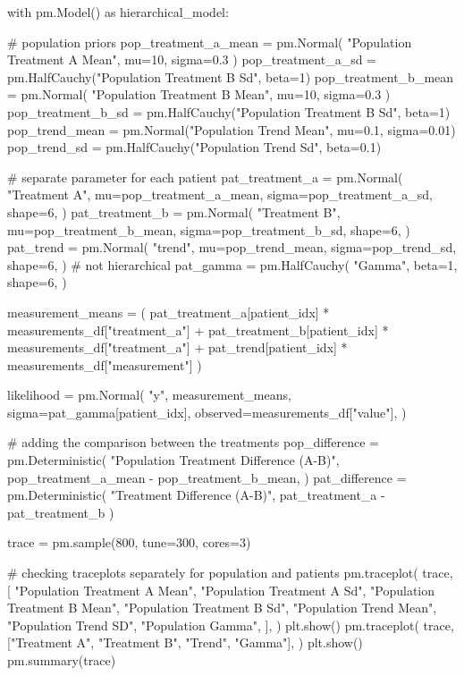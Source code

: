 \documentclass[12pt,a4paper,leqno]{report}
\theoremstyle{plain}
\theoremstyle{definition}
\theoremstyle{remark}
\begin{document}
\bigskip
\begin{pyverbatim}[][fontsize=\footnotesize]

with pm.Model() as hierarchical_model:

    # population priors
    pop_treatment_a_mean = pm.Normal(
        "Population Treatment A Mean", mu=10, sigma=0.3
    )
    pop_treatment_a_sd = pm.HalfCauchy("Population Treatment B Sd", beta=1)
    pop_treatment_b_mean = pm.Normal(
        "Population Treatment B Mean", mu=10, sigma=0.3
    )
    pop_treatment_b_sd = pm.HalfCauchy("Population Treatment B Sd", beta=1)
    pop_trend_mean = pm.Normal("Population Trend Mean", mu=0.1, sigma=0.01)
    pop_trend_sd = pm.HalfCauchy("Population Trend Sd", beta=0.1)

    # separate parameter for each patient
    pat_treatment_a = pm.Normal(
        "Treatment A",
        mu=pop_treatment_a_mean,
        sigma=pop_treatment_a_sd,
        shape=6,
    )
    pat_treatment_b = pm.Normal(
        "Treatment B",
        mu=pop_treatment_b_mean,
        sigma=pop_treatment_b_sd,
        shape=6,
    )
    pat_trend = pm.Normal(
        "trend",
        mu=pop_trend_mean,
        sigma=pop_trend_sd,
        shape=6,
    )
    # not hierarchical
    pat_gamma = pm.HalfCauchy(
        "Gamma", beta=1, shape=6,
    )

    measurement_means = (
        pat_treatment_a[patient_idx] * measurements_df["treatment_a"]
        + pat_treatment_b[patient_idx] * measurements_df["treatment_a"]
        + pat_trend[patient_idx] * measurements_df["measurement"]
    )

    likelihood = pm.Normal(
        "y",
        measurement_means,
        sigma=pat_gamma[patient_idx],
        observed=measurements_df["value"],
    )

    # adding the comparison between the treatments
    pop_difference = pm.Deterministic(
        "Population Treatment Difference (A-B)",
        pop_treatment_a_mean - pop_treatment_b_mean,
    )
    pat_difference = pm.Deterministic(
        "Treatment Difference (A-B)", pat_treatment_a - pat_treatment_b
    )

    trace = pm.sample(800, tune=300, cores=3)

    # checking traceplots separately for population and patients
    pm.traceplot(
        trace,
        [
            "Population Treatment A Mean",
            "Population Treatment A Sd",
            "Population Treatment B Mean",
            "Population Treatment B Sd",
            "Population Trend Mean",
            "Population Trend SD",
            "Population Gamma",
        ],
    )
    plt.show()
    pm.traceplot(
        trace, ["Treatment A", "Treatment B", "Trend", "Gamma"],
    )
    plt.show()
    pm.summary(trace)


\end{pyverbatim}
\end{document}
